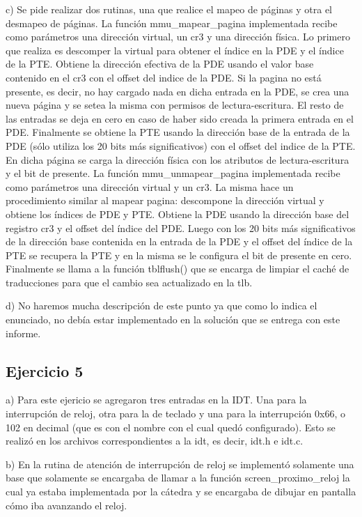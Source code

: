\documentclass[a4paper]{article}
\begin{document}
c) Se pide realizar dos rutinas, una que realice el mapeo de páginas y otra el desmapeo de páginas. La función mmu_mapear_pagina implementada recibe como parámetros una dirección virtual, un cr3 y una dirección física. Lo primero que realiza es descomper la virtual para obtener el índice en la PDE y el índice de la PTE. Obtiene la dirección efectiva de la PDE usando el valor base contenido en el cr3 con el offset del indice de la PDE. Si la pagina no está presente, es decir, no hay cargado nada en dicha entrada en la PDE, se crea una nueva página y se setea la misma con permisos de lectura-escritura. El resto de las entradas se deja en cero en caso de haber sido creada la primera entrada en el PDE. Finalmente se obtiene la PTE usando la dirección base de la entrada de la PDE (sólo utiliza los 20 bits más significativos) con el offset del indice de la PTE. En dicha página se carga la dirección física con los atributos de lectura-escritura y el bit de presente.
La función mmu_unmapear_pagina implementada recibe como parámetros una dirección virtual y un cr3. La misma hace un procedimiento similar al mapear pagina: descompone la dirección virtual y obtiene los índices de PDE y PTE. Obtiene la PDE usando la dirección base del registro cr3 y el offset del índice del PDE. Luego con los 20 bits más significativos de la dirección base contenida en la entrada de la PDE y el offset del índice de la PTE se recupera la PTE y en la misma se le configura el bit de presente en cero. Finalmente se llama a la función tblflush() que se encarga de limpiar el caché de traducciones para que el cambio sea actualizado en la tlb.

d) No haremos mucha descripción de este punto ya que como lo indica el enunciado, no debía estar implementado en la solución que se entrega con este informe.
\subsection{Ejercicio 5}

a) Para este ejericio se agregaron tres entradas en la IDT. Una para la interrupción de reloj, otra para la de teclado y una para la interrupción 0x66, o 102 en decimal (que es con el nombre con el cual quedó configurado).
Esto se realizó en los archivos correspondientes a la idt, es decir, idt.h e idt.c.

b) En la rutina de atención de interrupción de reloj se implementó solamente una base que solamente se encargaba de llamar a la función screen_proximo_reloj la
cual ya estaba implementada por la cátedra y se encargaba de dibujar en pantalla cómo iba avanzando el reloj.
\end{document}
